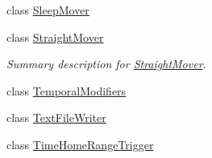 \begin{DoxyCompactItemize}
class \hyperlink{class_s_e_a_r_c_h_1_1_sleep_mover}{Sleep\-Mover}
\begin{DoxyCompactList}\small\item\em \end{DoxyCompactList}\item 
class \hyperlink{class_s_e_a_r_c_h_1_1_straight_mover}{Straight\-Mover}
\begin{DoxyCompactList}\small\item\em Summary description for \hyperlink{class_s_e_a_r_c_h_1_1_straight_mover}{Straight\-Mover}. \end{DoxyCompactList}\item 
class \hyperlink{class_s_e_a_r_c_h_1_1_temporal_modifiers}{Temporal\-Modifiers}
\item 
class \hyperlink{class_s_e_a_r_c_h_1_1_text_file_writer}{Text\-File\-Writer}
\item 
class \hyperlink{class_s_e_a_r_c_h_1_1_time_home_range_trigger}{Time\-Home\-Range\-Trigger}
\end{DoxyCompactItemize}
